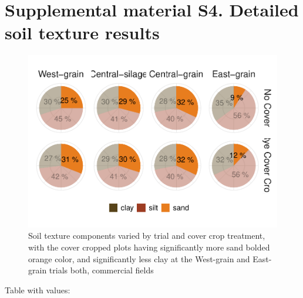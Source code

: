 \documentclass[
]{article}
\begin{document}
\hypertarget{supplemental-material-s4.-detailed-soil-texture-results}{%
\section{Supplemental material S4. Detailed soil texture
results}\label{supplemental-material-s4.-detailed-soil-texture-results}}

\begin{figure}
\centering
\includegraphics{rmd-supp-mat_files/figure-latex/texture-1.pdf}
\caption{Soil texture components varied by trial and cover crop
treatment, with the cover cropped plots having significantly more sand
bolded orange color, and significantly less clay at the West-grain and
East-grain trials both, commercial fields}
\end{figure}

Table with values:
\end{document}
